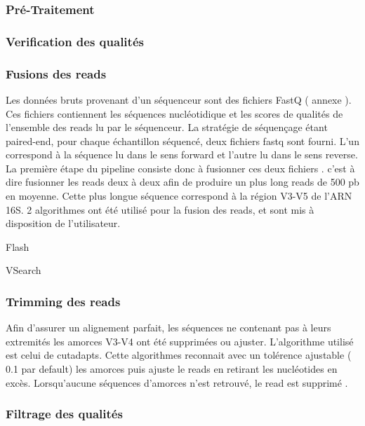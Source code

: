 \documentclass[12pt,a4paper]{article}
\begin{document}
\subsubsection{Pré-Traitement}

\subsubsection{Verification des qualités}

\subsubsection{Fusions des reads}

Les données bruts provenant d’un séquenceur sont des fichiers FastQ ( annexe ). Ces fichiers contiennent les séquences nucléotidique et les scores de qualités de l’ensemble des reads lu par le séquenceur. La stratégie de séquençage étant paired-end, pour chaque échantillon séquencé, deux fichiers fastq sont fourni. L’un correspond à la séquence lu dans le sens forward et l’autre lu dans le sens reverse.
La première étape du pipeline consiste donc à fusionner ces deux fichiers . c’est à dire fusionner les reads deux à deux afin de produire un plus long reads de 500 pb en moyenne. Cette plus longue séquence correspond à la région V3-V5 de l’ARN 16S.
2 algorithmes ont été utilisé pour la fusion des reads, et sont mis à disposition de l’utilisateur.

Flash

VSearch

\subsubsection{Trimming des reads}

Afin d’assurer un alignement parfait, les séquences ne contenant pas à leurs extremités les amorces V3-V4 ont été supprimées ou ajuster.
L’algorithme utilisé est celui de cutadapts. Cette algorithmes reconnait avec un tolérence ajustable ( 0.1 par default) les amorces puis ajuste le reads en retirant les nucléotides en excès. Lorsqu’aucune séquences d’amorces n’est retrouvé, le read est supprimé .

\subsubsection{Filtrage des qualités}
\end{document}
